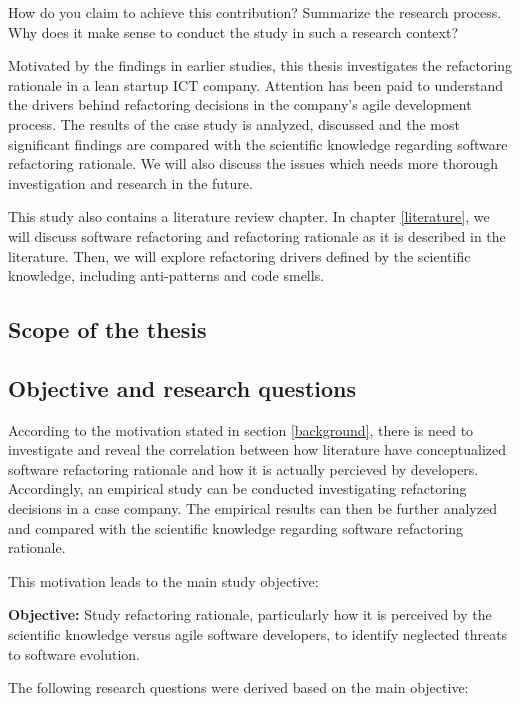 \documentclass[english,12pt,a4paper,pdftex,sci,utf8]{aaltothesis}
\begin{document}
How do you claim to achieve this contribution? Summarize the research process. Why does it make sense to conduct the study in such a research context? 

Motivated by the findings in earlier studies, this thesis investigates the refactoring rationale in a lean startup ICT company. Attention has been paid to understand the drivers behind refactoring decisions in the company's agile development process. The results of the case study is analyzed, discussed and the most significant findings are compared with the scientific knowledge regarding software refactoring rationale. We will also discuss the issues which needs more thorough investigation and research in the future.

This study also contains a literature review chapter. In chapter \ref{literature}, we will discuss software refactoring and refactoring rationale as it is described in the literature. Then, we will explore refactoring drivers defined by the scientific knowledge, including anti-patterns and code smells.

\subsection{Scope of the thesis} \label{scope}

\subsection{Objective and research questions} \label{questions}
According to the motivation stated in section \ref{background}, there is need to investigate and reveal the correlation between how literature have conceptualized software refactoring rationale and how it is actually percieved by developers. Accordingly, an empirical study can be conducted investigating refactoring decisions in a case company. The empirical results can then be further analyzed and compared with the scientific knowledge regarding software refactoring rationale. 

This motivation leads to the main study objective:

\textbf{Objective:} Study refactoring rationale, particularly how it is perceived by the scientific knowledge versus agile software developers, to identify neglected threats to software evolution.

The following research questions were derived based on the main objective:
\end{document}
